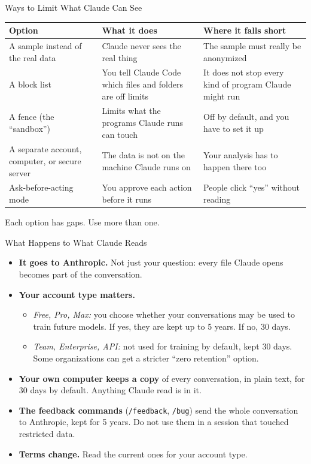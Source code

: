 \documentclass[aspectratio=169, 11pt]{beamer}
\begin{document}
\begin{frame}{Ways to Limit What Claude Can See}
  \small
  \renewcommand{\arraystretch}{1.2}
  \begin{tabular}{@{}L{0.26\textwidth}L{0.36\textwidth}L{0.32\textwidth}@{}}
    \toprule
    \textbf{Option} & \textbf{What it does} & \textbf{Where it falls short} \\
    \midrule
    A sample instead of the real data & Claude never sees the real thing & The sample must really be anonymized \\[0.2em]
    A block list & You tell Claude Code which files and folders are off limits & It does not stop every kind of program Claude might run \\[0.2em]
    A fence (the ``sandbox'') & Limits what the programs Claude runs can touch & Off by default, and you have to set it up \\[0.2em]
    A separate account, computer, or secure server & The data is not on the machine Claude runs on & Your analysis has to happen there too \\[0.2em]
    Ask-before-acting mode & You approve each action before it runs & People click ``yes'' without reading \\
    \bottomrule
  \end{tabular}

  \vspace{0.6em}
  \alert{Each option has gaps. Use more than one.} \hfill \hyperlink{privtech}{}
\end{frame}

\begin{frame}{What Happens to What Claude Reads}
  \begin{itemize}
    \item \textbf{It goes to Anthropic.} Not just your question: every file Claude opens becomes part of the conversation.
    \item \textbf{Your account type matters.}
      \begin{itemize}\small
        \item \emph{Free, Pro, Max:} you choose whether your conversations may be used to train future models. If yes, they are kept up to 5 years. If no, 30 days.
        \item \emph{Team, Enterprise, API:} not used for training by default, kept 30 days. Some organizations can get a stricter ``zero retention'' option.
      \end{itemize}
    \item \textbf{Your own computer keeps a copy} of every conversation, in plain text, for 30 days by default. Anything Claude read is in it.
    \item \textbf{The feedback commands} (\texttt{/feedback}, \texttt{/bug}) send the whole conversation to Anthropic, kept for 5 years. Do not use them in a session that touched restricted data.
    \item \textbf{Terms change.} Read the current ones for your account type.
  \end{itemize}
\end{frame}
\end{document}
